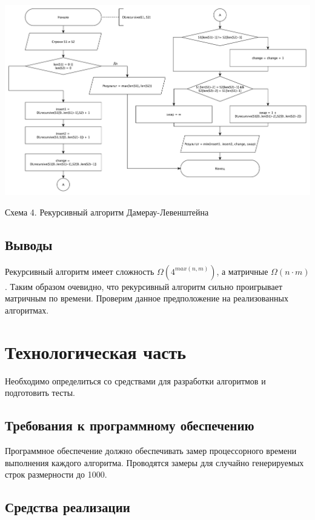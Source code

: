 \documentclass[a4paper,12pt]{article}
\begin{document}
\begin{center}
    \includegraphics[scale=0.4]{DLrecursive}

    Схема 4. Рекурсивный алгоритм Дамерау-Левенштейна
\end{center}

\subsection{Выводы}

Рекурсивный алгоритм имеет сложность $\Omega (4^{max(n,m)})$, а матричные
$\Omega (n \cdot m)$. Таким образом очевидно, что рекурсивный алгоритм
сильно проигрывает матричным по времени. Проверим данное предположение
на реализованных алгоритмах.

\newpage
\section{Технологическая часть}

Необходимо определиться со средствами для разработки алгоритмов и подготовить
тесты.

\subsection{Требования к программному обеспечению}

Программное обеспечение должно обеспечивать замер процессорного времени
выполнения каждого алгоритма. Проводятся замеры для случайно генерируемых
строк размерности до 1000.

\subsection{Средства реализации}
\end{document}
